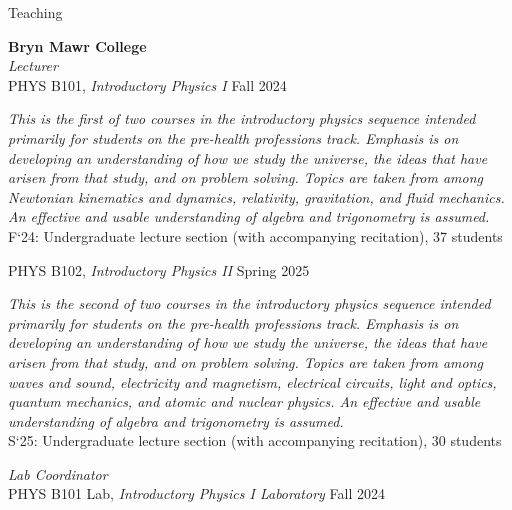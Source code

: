 \documentclass{resume} %
\newcommand{\forceindent}{\leavevmode{\parindent=1em\indent}}
\begin{document}


\begin{rSection}{Teaching}

\textbf{Bryn Mawr College} \\
\textit{Lecturer}\\
\forceindent PHYS B101, \textit{Introductory Physics I} \hfill{Fall 2024}
\begin{description}[leftmargin=2em, style=nextline]
\vspace{-0.5em}
\item[~] \textit{This is the first of two courses in the introductory physics sequence intended primarily for students on the pre-health professions track. Emphasis is on developing an understanding of how we study the universe, the ideas that have arisen from that study, and on problem solving. Topics are taken from among Newtonian kinematics and dynamics, relativity, gravitation, and fluid mechanics. An effective and usable understanding of algebra and trigonometry is assumed.}\\
  \forceindent\forceindent F`24: Undergraduate lecture section (with accompanying recitation), 37 students
\end{description}
\forceindent PHYS B102, \textit{Introductory Physics II} \hfill{Spring 2025}
\begin{description}[leftmargin=2em, style=nextline]
\vspace{-0.5em}
\item[~] \textit{This is the second of two courses in the introductory physics sequence intended primarily for students on the pre-health professions track. Emphasis is on developing an understanding of how we study the universe, the ideas that have arisen from that study, and on problem solving. Topics are taken from among waves and sound, electricity and magnetism, electrical circuits, light and optics, quantum mechanics, and atomic and nuclear physics. An effective and usable understanding of algebra and trigonometry is assumed.}\\
\forceindent\forceindent S`25: Undergraduate lecture section (with accompanying recitation), 30 students
\end{description}
\textit{Lab Coordinator}\\
\forceindent PHYS B101 Lab, \textit{Introductory Physics I Laboratory} \hfill{Fall 2024}
\begin{description}[leftmargin=2em, style=nextline]

\end{description}
\end{rSection}
\end{document}
